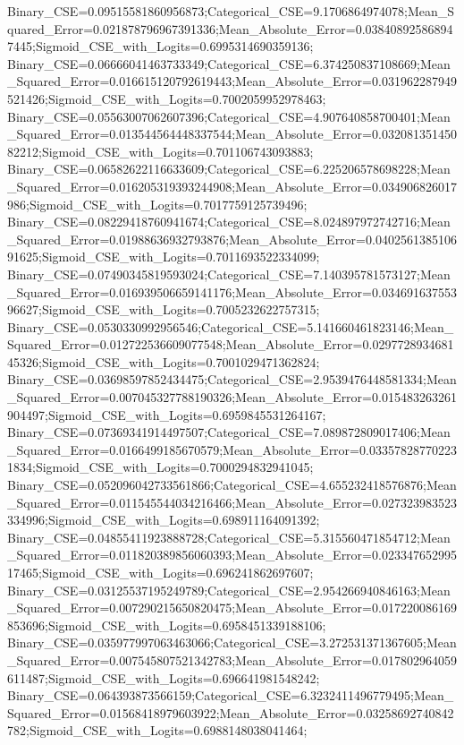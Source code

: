 Binary_CSE=0.09515581860956873;Categorical_CSE=9.1706864974078;Mean_Squared_Error=0.021878796967391336;Mean_Absolute_Error=0.038408925868947445;Sigmoid_CSE_with_Logits=0.6995314690359136;
Binary_CSE=0.06666041463733349;Categorical_CSE=6.374250837108669;Mean_Squared_Error=0.016615120792619443;Mean_Absolute_Error=0.031962287949521426;Sigmoid_CSE_with_Logits=0.7002059952978463;
Binary_CSE=0.05563007062607396;Categorical_CSE=4.907640858700401;Mean_Squared_Error=0.013544564448337544;Mean_Absolute_Error=0.03208135145082212;Sigmoid_CSE_with_Logits=0.701106743093883;
Binary_CSE=0.06582622116633609;Categorical_CSE=6.225206578698228;Mean_Squared_Error=0.016205319393244908;Mean_Absolute_Error=0.034906826017986;Sigmoid_CSE_with_Logits=0.7017759125739496;
Binary_CSE=0.08229418760941674;Categorical_CSE=8.024897972742716;Mean_Squared_Error=0.01988636932793876;Mean_Absolute_Error=0.040256138510691625;Sigmoid_CSE_with_Logits=0.7011693522334099;
Binary_CSE=0.07490345819593024;Categorical_CSE=7.140395781573127;Mean_Squared_Error=0.016939506659141176;Mean_Absolute_Error=0.03469163755396627;Sigmoid_CSE_with_Logits=0.7005232622757315;
Binary_CSE=0.0530330992956546;Categorical_CSE=5.141660461823146;Mean_Squared_Error=0.012722536609077548;Mean_Absolute_Error=0.029772893468145326;Sigmoid_CSE_with_Logits=0.7001029471362824;
Binary_CSE=0.03698597852434475;Categorical_CSE=2.9539476448581334;Mean_Squared_Error=0.007045327788190326;Mean_Absolute_Error=0.015483263261904497;Sigmoid_CSE_with_Logits=0.6959845531264167;
Binary_CSE=0.07369341914497507;Categorical_CSE=7.089872809017406;Mean_Squared_Error=0.0166499185670579;Mean_Absolute_Error=0.033578287702231834;Sigmoid_CSE_with_Logits=0.7000294832941045;
Binary_CSE=0.052096042733561866;Categorical_CSE=4.655232418576876;Mean_Squared_Error=0.011545544034216466;Mean_Absolute_Error=0.027323983523334996;Sigmoid_CSE_with_Logits=0.698911164091392;
Binary_CSE=0.04855411923888728;Categorical_CSE=5.315560471854712;Mean_Squared_Error=0.011820389856060393;Mean_Absolute_Error=0.02334765299517465;Sigmoid_CSE_with_Logits=0.696241862697607;
Binary_CSE=0.03125537195249789;Categorical_CSE=2.954266940846163;Mean_Squared_Error=0.007290215650820475;Mean_Absolute_Error=0.017220086169853696;Sigmoid_CSE_with_Logits=0.6958451339188106;
Binary_CSE=0.035977997063463066;Categorical_CSE=3.272531371367605;Mean_Squared_Error=0.007545807521342783;Mean_Absolute_Error=0.017802964059611487;Sigmoid_CSE_with_Logits=0.696641981548242;
Binary_CSE=0.064393873566159;Categorical_CSE=6.3232411496779495;Mean_Squared_Error=0.01568418979603922;Mean_Absolute_Error=0.03258692740842782;Sigmoid_CSE_with_Logits=0.6988148038041464;
